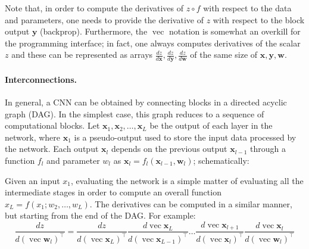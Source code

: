 \documentclass[12pt]{article}
\newcommand{\vv}{\operatorname{vec}}
\newcommand{\bx}{\mathbf{x}}
\newcommand{\by}{\mathbf{y}}
\newcommand{\bw}{\mathbf{w}}
\begin{document}
Note that, in order to compute the derivatives of $z \circ f$ with respect to the data and parameters, one needs to provide the derivative of $z$ with respect to the block output $\by$ (backprop). Furthermore, the $\vv$ notation is somewhat an overkill for the programming interface; in fact, one always computes derivatives of the scalar $z$ and these can be represented as arrays $\frac{dz}{d\bx}, \frac{dz}{d\by}, \frac{dz}{d\bw}$ of the same size of $\bx,\by,\bw$.


\paragraph{Interconnections.} In general, a CNN can be obtained by connecting blocks in a directed acyclic graph (DAG). In the simplest case, this graph reduces to a sequence of computational blocks. Let $\bx_1,\bx_2,\dots,\bx_L$ be the output of each layer in the network, where $\bx_1$ is a pseudo-output used to store the input data processed by the network. Each output $\bx_l$ depends on the previous output $\bx_{l-1}$ through a function $f_l$ and parameter $w_l$ as $\bx_l = f_l(\bx_{l-1},\bw_l)$; schematically:
\begin{center}
\end{center}
Given an input $x_1$, evaluating the network is a simple matter of evaluating all the intermediate stages in order to compute an overall function $x_L = f(x_1;w_2,\dots,w_L)$. The derivatives can be computed in a similar manner, but starting from the end of the DAG. For example:
\[
 \frac{dz}{d(\vv\bw_l)^\top}
 =
 \frac{dz}{d(\vv\bx_L)^\top}
 \frac{d\vv\bx_{L}}{d(\vv\bx_{L-1})^\top}
 \dots
 \frac{d\vv\bx_{l+1}}{d(\vv\bx_{l})^\top}
 \frac{d\vv\bx_{l}}{d(\vv\bw_{l})^\top}
\]
\end{document}
